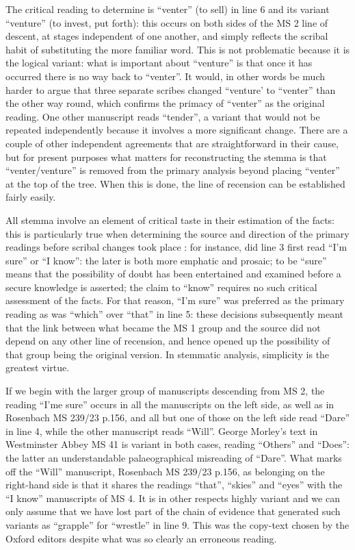 \begin{paper}
The critical reading to determine is ``venter'' (to sell) in line 6 and
its variant ``venture'' (to invest, put forth): this occurs on both sides
of the MS 2 line of descent, at stages independent of one
another, and simply reflects the scribal habit of substituting the more
familiar word. This is not problematic because it is the logical
variant: what is important about ``venture'' is that once it has occurred
there is no way back to ``venter''. It would, in other words be much
harder to argue that three separate scribes changed ``venture' to ``venter''
than the other way round, which confirms the primacy of ``venter'' as the
original reading. One other manuscript reads ``tender'', a variant that
would not be repeated independently because it involves a more
significant change. There are a couple of other independent agreements
that are straightforward in their cause, but for present purposes what
matters for reconstructing the stemma is that ``venter/venture'' is
removed from the primary analysis beyond placing ``venter'' at the top of
the tree. When this is done, the line of recension can be established
fairly easily.

All stemma involve an element of critical taste in their estimation of
the facts: this is particularly true when determining the source and
direction of the primary readings before scribal changes took place \citep{love_ranking_1984}: for instance, did line 3 first read ``I'm sure'' or ``I know'':
the later is both more emphatic and prosaic; to be ``sure'' means that the
possibility of doubt has been entertained and examined before a secure
knowledge is asserted; the claim to ``know'' requires no such critical
assessment of the facts. For that reason, ``I'm sure'' was preferred as
the primary reading as was ``which'' over ``that'' in line 5: these
decisions subsequently meant that the link between what became the MS 1
group and the source did not depend on any other line of recension, and
hence opened up the possibility of that group being the original
version. In stemmatic analysis, simplicity is the greatest virtue.

If we begin with the larger group of manuscripts descending from
MS 2, the reading ``I'me sure'' occurs in all the manuscripts on
the left side, as well as in Rosenbach MS 239/23 p.156, and all but one
of those on the left side read ``Dare'' in line 4, while the other
manuscript reads ``Will''. George Morley's text in Westminster Abbey MS 41
is variant in both cases, reading ``Others'' and ``Does'': the latter an
understandable palaeographical misreading of ``Dare''. What marks off the
``Will'' manuscript, Rosenbach MS 239/23 p.156, as belonging on the
right-hand side is that it shares the readings ``that'', ``skies'' and
``eyes'' with the ``I know'' manuscripts of MS 4. It is in other respects
highly variant and we can only assume that we have lost part of the
chain of evidence that generated such variants as ``grapple'' for
``wrestle'' in line 9. This was the copy-text chosen by the Oxford editors
despite what was so clearly an erroneous reading.


\end{paper}
